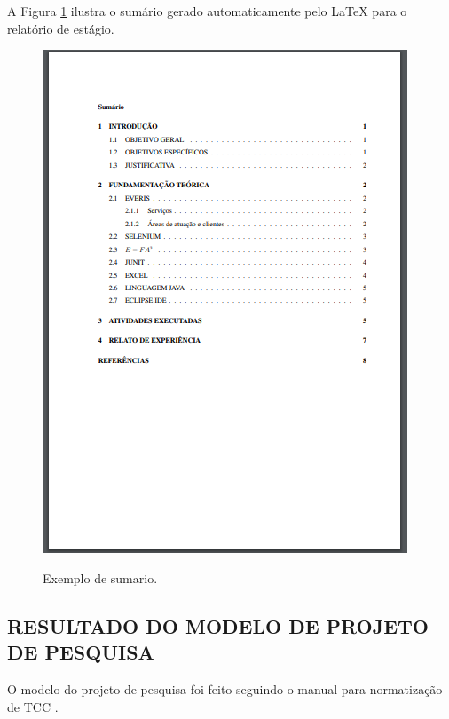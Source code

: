 \newpage
A Figura \ref{sumest} ilustra o sumário gerado automaticamente pelo LaTeX para o relatório de estágio.\\
\begin{figure}[h]
	\centering
	\includegraphics{imagens/relatorioEstagio/Sumario.png}\\
	\caption{Exemplo de sumario.}
	\label{sumest}
\end{figure}

\newpage
\subsection{RESULTADO DO MODELO DE PROJETO DE PESQUISA}
O modelo do projeto de pesquisa foi feito seguindo o manual para normatização de TCC \cite{manualTCC}.

